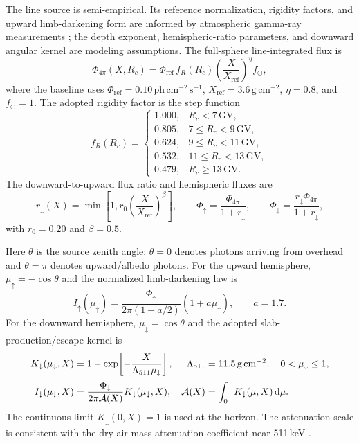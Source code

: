 \documentclass[11pt]{article}
\begin{document}
The line source is semi-empirical. Its reference normalization, rigidity factors,
and upward limb-darkening form are informed by atmospheric gamma-ray measurements
\cite{Mahoney1981Atmospheric,Harris2003Atmospheric}; the depth exponent,
hemispheric-ratio parameters, and downward angular kernel are modeling assumptions.
The full-sphere line-integrated flux is
\begin{equation}
  \Phi_{4\pi}(X,R_c)=\Phi_{\mathrm{ref}}\,f_R(R_c)
  \left(\frac{X}{X_{\mathrm{ref}}}\right)^{\eta} f_{\odot},
  \label{eq:atm511_flux}
\end{equation}
where the baseline uses $\Phi_{\mathrm{ref}}=0.10\,
\mathrm{ph\,cm^{-2}\,s^{-1}}$, $X_{\mathrm{ref}}=3.6\,
\mathrm{g\,cm^{-2}}$, $\eta=0.8$, and $f_{\odot}=1$. The adopted rigidity
factor is the step function
\begin{equation}
 f_R(R_c)=
 \begin{cases}
  1.000, & R_c<7\,\mathrm{GV},\\
  0.805, & 7\le R_c<9\,\mathrm{GV},\\
  0.624, & 9\le R_c<11\,\mathrm{GV},\\
  0.532, & 11\le R_c<13\,\mathrm{GV},\\
  0.479, & R_c\ge13\,\mathrm{GV}.
 \end{cases}
 \label{eq:atm511_rigidity}
\end{equation}
The downward-to-upward flux ratio and hemispheric fluxes are
\begin{equation}
  r_{\downarrow}(X)=\min\!\left[1,r_0
  \left(\frac{X}{X_{\mathrm{ref}}}\right)^{\beta}\right],\qquad
  \Phi_{\uparrow}=\frac{\Phi_{4\pi}}{1+r_{\downarrow}},\qquad
  \Phi_{\downarrow}=\frac{r_{\downarrow}\Phi_{4\pi}}{1+r_{\downarrow}},
  \label{eq:atm511_split}
\end{equation}
with $r_0=0.20$ and $\beta=0.5$.

Here $\theta$ is the source zenith angle: $\theta=0$ denotes photons arriving
from overhead and $\theta=\pi$ denotes upward/albedo photons. For the upward
hemisphere, $\mu_{\uparrow}=-\cos\theta$ and the normalized
limb-darkening law is
\begin{equation}
  I_{\uparrow}(\mu_{\uparrow})=
  \frac{\Phi_{\uparrow}}{2\pi(1+a/2)}(1+a\mu_{\uparrow}),
  \qquad a=1.7 .
  \label{eq:atm511_upward}
\end{equation}
For the downward hemisphere, $\mu_{\downarrow}=\cos\theta$ and the adopted
slab-production/escape kernel is
\begin{align}
  K_{\downarrow}(\mu_{\downarrow},X)
    &=1-\exp\!\left[-\frac{X}{\Lambda_{511}\mu_{\downarrow}}\right],
    &\Lambda_{511}&=11.5\,\mathrm{g\,cm^{-2}},\quad 0<\mu_{\downarrow}\le1, \notag\\
  I_{\downarrow}(\mu_{\downarrow},X)
    &=\frac{\Phi_{\downarrow}}{2\pi\mathcal{A}(X)}
      K_{\downarrow}(\mu_{\downarrow},X),
    &\mathcal{A}(X)&=\int_0^1K_{\downarrow}(\mu,X)\,\mathrm{d}\mu .
  \label{eq:atm511_downward}
\end{align}
The continuous limit $K_{\downarrow}(0,X)=1$ is used at the horizon. The
attenuation scale is consistent with the dry-air mass attenuation coefficient
near 511\,keV \cite{NISTXCOM}.
\end{document}
